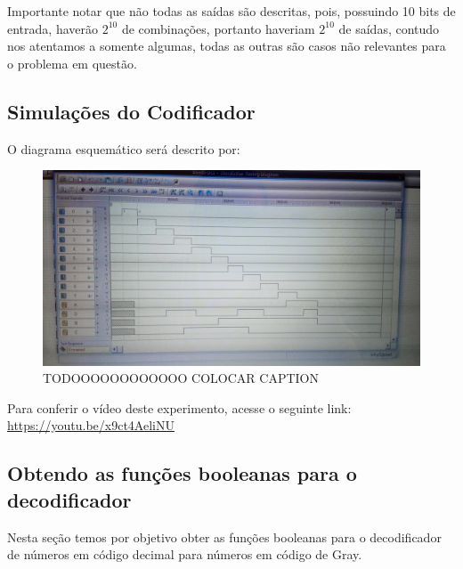 \documentclass[12pt]{article}
\begin{document}
Importante notar que não todas as saídas são descritas, pois, possuindo 10 bits
de entrada, haverão $2^{10}$ de combinações, portanto haveriam $2^{10}$ de
saídas, contudo nos atentamos a somente algumas, todas as outras são casos não
relevantes para o problema em questão.

\subsection{Simulações do Codificador}\label{sec:2.2}

O diagrama esquemático será descrito por:

\begin{figure}[H]
    \centering
    \includegraphics[width=12cm]{Exp05/2.2.png}
    \caption{TODOOOOOOOOOOOO COLOCAR CAPTION}
    \label{fig:2.2.png}
\end{figure}

Para conferir o vídeo deste experimento, acesse o seguinte link:
\href{https://youtu.be/x9ct4AeliNU}{https://youtu.be/x9ct4AeliNU}

\subsection{Obtendo as funções booleanas para o decodificador}\label{sec:2.3}

Nesta seção temos por objetivo obter as funções booleanas para o decodificador
de números em código decimal para números em código de Gray.
\end{document}
